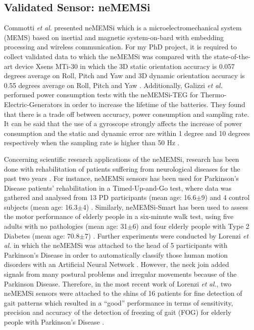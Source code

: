 \documentclass[9pt,journal,onecolumn,compsoc]{IEEEtran}
\begin{document}
\subsection{Validated Sensor: neMEMSi}

Commotti \textit{et al.} presented neMEMSi which is a microelectromechanical system (MEMS)  based on
inertial and magnetic system-on-bard with embedding processing and wireless communication.
For my PhD project, it is required to collect validated data to which
the neMEMSi was compared with the state-of-the-art device Xsens MTi-30
in which the 3D static orientation accuracy is 0.057 degrees average on Roll, Pitch and Yaw
and 3D dynamic orientation accuracy is 0.55 degrees average on Roll, Pitch and Yaw \cite{Comotti2014}.
Additionally, Galizzi \textit{et al.} performed power consumption tests with the
neMEMSi-TEG for Thermo-Electric-Generators in order to increase the lifetime of the batteries.
They found that there is a trade off between accuracy, power consumption and sampling rate.
It can be said that the use of a gyroscope strongly affects the increase of power consumption
and the static and dynamic error are within 1 degree and 10 degrees respectively
when the sampling rate is higher than 50 Hz \cite{Galizzi2015}.

Concerning scientific research applications of the neMEMSi,
research has been done with rehabilitation of patients suffering from neurological diseases
for the past two years \cite{Caldara2014, Caldara2015, Lorenzi2015, Lorenzi2016}.
For instance, neMEMSi sensors has been used for Parkinson's Disease patients' rehabilitation
in a Timed-Up-and-Go test, where data was gathered and analysed from
13 PD participants (mean age: 16.6$\pm$9) and 4 control subjects (mean age: 16.3$\pm$4) \cite{Caldara2014}.
Similarly, neMEMSi-Smart has been used to assess the motor performance of elderly people
in a six-minute walk test, using five adults with no pathologies (mean age: 31$\pm$6) and four elderly people with Type 2 Diabetes
(mean age: 70.8$\pm$7) \cite{Caldara2015}.
Further experiments were conducted by Lorenzi \textit{et al.} in which the neMEMSi was attached to the head
of 5 participants  with Parkinson's Disease in order to
automatically classify those human motion disorders with an Artificial Neural Network \cite{Lorenzi2015}.
However, the neck join added signals from many postural problems
and irregular movements because of the Parkinson Disease.
Therefore, in the most recent work of Lorenzi \textit{et al.}, two neMEMSi sensors were attached to the shins
of 16 patients for fine detection of gait patterns
which resulted in a ``good'' performance in terms of sensitivity, precision and accuracy of
the detection of freezing of gait (FOG) for elderly people with Parkinson's Disease  \cite{Lorenzi2016}.
\end{document}
